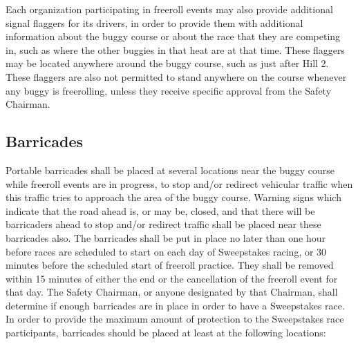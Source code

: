 	Each organization participating in freeroll events may also provide additional signal flaggers for its drivers, in order to provide them with additional information about the buggy course or about the race that they are competing in, such as where the other buggies in that heat are at that time. These flaggers may be located anywhere around the buggy course, such as just after Hill 2. These flaggers are also not permitted to stand anywhere on the course whenever any buggy is freerolling, unless they receive specific approval from the Safety Chairman.
	
\subsection{Barricades}
\label{subsec:Barricades}

	Portable barricades shall be placed at several locations near the buggy course while freeroll events are in progress, to stop and/or redirect vehicular traffic when this traffic tries to approach the area of the buggy course. Warning signs which indicate that the road ahead is, or may be, closed, and that there will be barricaders ahead to stop and/or redirect traffic shall be placed near these barricades also. The barricades shall be put in place no later than one hour before races are scheduled to start on each day of Sweepstakes racing, or 30 minutes before the scheduled start of freeroll practice. They shall be removed within 15 minutes of either the end or the cancellation of the freeroll event for that day. The Safety Chairman, or anyone designated by that Chairman, shall determine if enough barricades are in place in order to have a Sweepstakes race. In order to provide the maximum amount of protection to the Sweepstakes race participants, barricades should be placed at least at the following locations:

